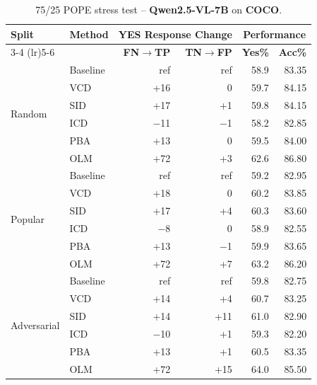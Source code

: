 \documentclass[11pt]{article}
\begin{document}

\begin{table}[ht]
\centering
\caption{75/25 POPE stress test -- \textbf{Qwen2.5-VL-7B} on \textbf{COCO}.}
\label{tab:75_25_qwen_coco}
\setlength{\tabcolsep}{6pt}
\renewcommand{\arraystretch}{1.1}
\begin{tabular}{l|l|rr|rr}
\toprule
\multirow{2}{*}{\textbf{Split}} &
\multirow{2}{*}{\textbf{Method}} &
\multicolumn{2}{c|}{\textbf{YES Response Change}} &
\multicolumn{2}{c}{\textbf{Performance}} \\
\cmidrule(lr){3-4} \cmidrule(lr){5-6}
& & \textbf{FN$\to$TP} & \textbf{TN$\to$FP} & \textbf{Yes\%} & \textbf{Acc\%} \\
\midrule

\multirow{6}{*}{Random}
& Baseline & ref    & ref   & 58.9 & 83.35 \\
& VCD      & +16    & 0     & 59.7 & 84.15 \\
& SID      & +17    & +1    & 59.8 & 84.15 \\
& ICD      & $-$11  & $-$1  & 58.2 & 82.85 \\
& PBA      & +13    & 0     & 59.5 & 84.00 \\
& OLM      & +72    & +3    & 62.6 & 86.80 \\
\midrule

\multirow{6}{*}{Popular}
& Baseline & ref    & ref   & 59.2 & 82.95 \\
& VCD      & +18    & 0     & 60.2 & 83.85 \\
& SID      & +17    & +4    & 60.3 & 83.60 \\
& ICD      & $-$8   & 0     & 58.9 & 82.55 \\
& PBA      & +13    & $-$1  & 59.9 & 83.65 \\
& OLM      & +72    & +7    & 63.2 & 86.20 \\
\midrule

\multirow{6}{*}{Adversarial}
& Baseline & ref    & ref   & 59.8 & 82.75 \\
& VCD      & +14    & +4    & 60.7 & 83.25 \\
& SID      & +14    & +11   & 61.0 & 82.90 \\
& ICD      & $-$10  & +1    & 59.3 & 82.20 \\
& PBA      & +13    & +1    & 60.5 & 83.35 \\
& OLM      & +72    & +15   & 64.0 & 85.50 \\
\bottomrule
\end{tabular}
\end{table}
\end{document}
